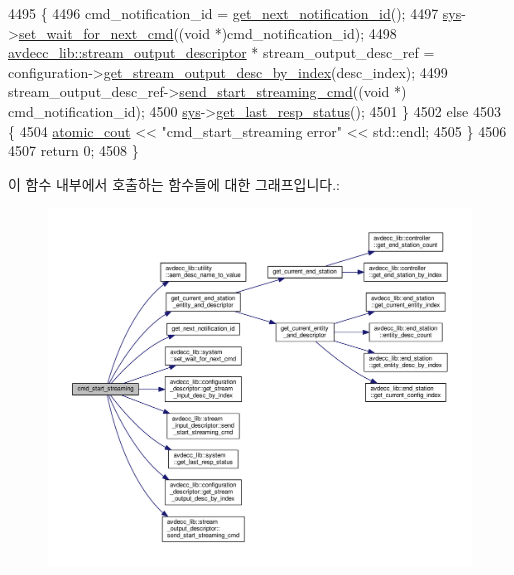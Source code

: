 \begin{DoxyCode}
4495     \{
4496         cmd\_notification\_id = \hyperlink{classcmd__line_a57486218387d1aa9d262eb7c176154ad}{get\_next\_notification\_id}();
4497         \hyperlink{classcmd__line_a485db4800e331cb4052c447fdf5d154e}{sys}->\hyperlink{classavdecc__lib_1_1system_a26b769584f10225077da47583edda33e}{set\_wait\_for\_next\_cmd}((\textcolor{keywordtype}{void} *)cmd\_notification\_id);
4498         \hyperlink{classavdecc__lib_1_1stream__output__descriptor}{avdecc\_lib::stream\_output\_descriptor} * stream\_output\_desc\_ref =
       configuration->\hyperlink{classavdecc__lib_1_1configuration__descriptor_a300ea5957342e2e9579318135da02856}{get\_stream\_output\_desc\_by\_index}(desc\_index);
4499         stream\_output\_desc\_ref->\hyperlink{classavdecc__lib_1_1stream__output__descriptor_a9b919107737ba0b3d86c2c316cf3a765}{send\_start\_streaming\_cmd}((\textcolor{keywordtype}{void} *)
      cmd\_notification\_id);
4500         \hyperlink{classcmd__line_a485db4800e331cb4052c447fdf5d154e}{sys}->\hyperlink{classavdecc__lib_1_1system_aa63e8d1a4e51f695cdcccc9340922407}{get\_last\_resp\_status}();
4501     \}
4502     \textcolor{keywordflow}{else}
4503     \{
4504         \hyperlink{cmd__line_8h_a0bc38ccc65c79ba06c6fcd7b4bf554c3}{atomic\_cout} << \textcolor{stringliteral}{"cmd\_start\_streaming error"} << std::endl;
4505     \}
4506 
4507     \textcolor{keywordflow}{return} 0;
4508 \}
\end{DoxyCode}


이 함수 내부에서 호출하는 함수들에 대한 그래프입니다.\+:
\nopagebreak
\begin{figure}[H]
\begin{center}
\leavevmode
\includegraphics[width=350pt]{classcmd__line_a576203de7a50eaf2deda5b7c7ed8ee86_cgraph}
\end{center}
\end{figure}




